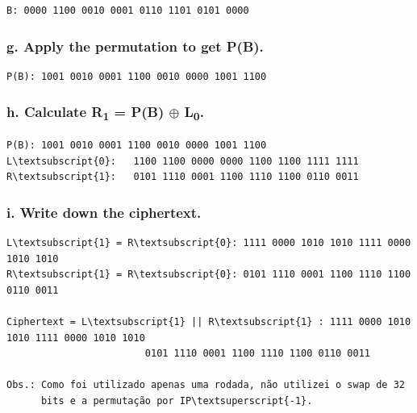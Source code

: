 \documentclass[
    article,            %
    11pt,               %
    oneside,            %
    a4paper,            %
    english,            %
    brazil,             %
    sumario=tradicional,
    ]{abntex2}
\begin{document}
\begin{Verbatim}[commandchars=\\\{\}, fontsize=\footnotesize]
B: 0000 1100 0010 0001 0110 1101 0101 0000
\end{Verbatim}

\subsubsection*{\textbf{g. Apply the permutation to get P(B).}}

\begin{Verbatim}[commandchars=\\\{\}, fontsize=\footnotesize]
P(B): 1001 0010 0001 1100 0010 0000 1001 1100
\end{Verbatim}

\subsubsection*{\textbf{h. Calculate R\textsubscript{1} = P(B) $\oplus$ L\textsubscript{0}.}}

\begin{Verbatim}[commandchars=\\\{\}, fontsize=\footnotesize]
P(B): 1001 0010 0001 1100 0010 0000 1001 1100
L\textsubscript{0}:   1100 1100 0000 0000 1100 1100 1111 1111
R\textsubscript{1}:   0101 1110 0001 1100 1110 1100 0110 0011
\end{Verbatim}

\subsubsection*{\textbf{i. Write down the ciphertext.}}

\begin{Verbatim}[commandchars=\\\{\}, fontsize=\footnotesize]
L\textsubscript{1} = R\textsubscript{0}: 1111 0000 1010 1010 1111 0000 1010 1010
R\textsubscript{1} = R\textsubscript{0}: 0101 1110 0001 1100 1110 1100 0110 0011

Ciphertext = L\textsubscript{1} || R\textsubscript{1} : 1111 0000 1010 1010 1111 0000 1010 1010
                        0101 1110 0001 1100 1110 1100 0110 0011

Obs.: Como foi utilizado apenas uma rodada, não utilizei o swap de 32
      bits e a permutação por IP\textsuperscript{-1}.
\end{Verbatim}

\end{document}

